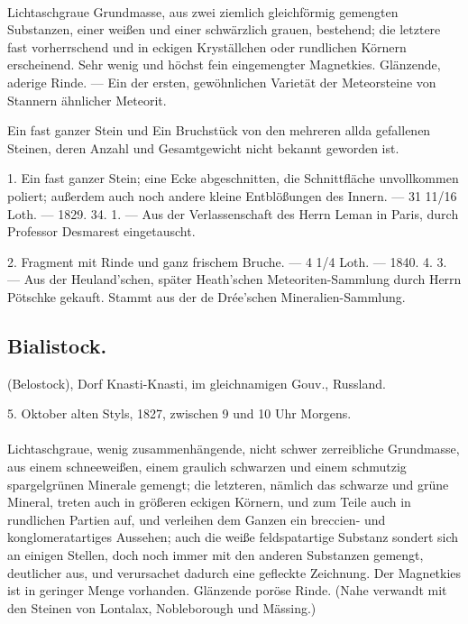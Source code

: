 \documentclass[a4paper, 11pt, oneside, polutonikogreek, german]{article}
\begin{document}
\paragraph{}
Lichtaschgraue Grundmasse, aus zwei ziemlich gleichförmig gemengten Substanzen, einer weißen und einer schwärzlich grauen, bestehend; die letztere fast vorherrschend und in eckigen Kryställchen oder rundlichen Körnern erscheinend. Sehr wenig und höchst fein eingemengter Magnetkies. Glänzende, aderige Rinde. — Ein der ersten, gewöhnlichen Varietät der Meteorsteine von Stannern ähnlicher Meteorit.

Ein fast ganzer Stein und Ein Bruchstück von den mehreren allda gefallenen Steinen, deren Anzahl und Gesamtgewicht nicht bekannt geworden ist.

1. Ein fast ganzer Stein; eine Ecke abgeschnitten, die Schnittfläche unvollkommen poliert; außerdem auch noch andere kleine Entblößungen des Innern. — 31 11/16 Loth. — 1829. 34. 1. — Aus der Verlassenschaft des Herrn Leman in Paris, durch Professor Desmarest eingetauscht.

2. Fragment mit Rinde und ganz frischem Bruche. — 4 1/4 Loth. — 1840. 4. 3. — Aus der Heuland'schen, später Heath'schen Meteoriten-Sammlung durch Herrn Pötschke gekauft. Stammt aus der de Drée'schen Mineralien-Sammlung.
\subsection{Bialistock.}
\begin{center}
\small
(Belostock), Dorf Knasti-Knasti, im gleichnamigen Gouv., Russland.

5. Oktober alten Styls, 1827, zwischen 9 und 10 Uhr Morgens.
\end{center}
\paragraph{}
Lichtaschgraue, wenig zusammenhängende, nicht schwer zerreibliche Grundmasse, aus einem schneeweißen, einem graulich schwarzen und einem schmutzig spargelgrünen Minerale gemengt; die letzteren, nämlich das schwarze und grüne Mineral, treten auch in größeren eckigen Körnern, und zum Teile auch in rundlichen Partien auf, und verleihen dem Ganzen ein breccien- und konglomeratartiges Aussehen; auch die weiße feldspatartige Substanz sondert sich an einigen Stellen, doch noch immer mit den anderen Substanzen gemengt, deutlicher aus, und verursachet dadurch eine gefleckte Zeichnung. Der Magnetkies ist in geringer Menge vorhanden. Glänzende poröse Rinde. (Nahe verwandt mit den Steinen von Lontalax, Nobleborough und Mässing.)
\end{document}
